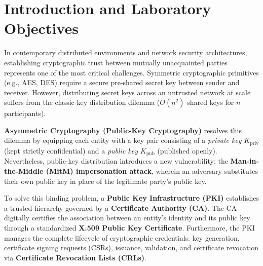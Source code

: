 \documentclass[12pt,a4paper]{article}
\begin{document}
\section{Introduction and Laboratory Objectives}

In contemporary distributed environments and network security architectures, establishing cryptographic trust between mutually unacquainted parties represents one of the most critical challenges. Symmetric cryptographic primitives (e.g., AES, DES) require a secure pre-shared secret key between sender and receiver. However, distributing secret keys across an untrusted network at scale suffers from the classic key distribution dilemma ($O(n^2)$ shared keys for $n$ participants).

\textbf{Asymmetric Cryptography (Public-Key Cryptography)} resolves this dilemma by equipping each entity with a key pair consisting of a \textit{private key} $K_{\text{priv}}$ (kept strictly confidential) and a \textit{public key} $K_{\text{pub}}$ (published openly). Nevertheless, public-key distribution introduces a new vulnerability: the \textbf{Man-in-the-Middle (MitM) impersonation attack}, wherein an adversary substitutes their own public key in place of the legitimate party's public key. 

To solve this binding problem, a \textbf{Public Key Infrastructure (PKI)} establishes a trusted hierarchy governed by a \textbf{Certificate Authority (CA)}. The CA digitally certifies the association between an entity's identity and its public key through a standardized \textbf{X.509 Public Key Certificate}. Furthermore, the PKI manages the complete lifecycle of cryptographic credentials: key generation, certificate signing requests (CSRs), issuance, validation, and certificate revocation via \textbf{Certificate Revocation Lists (CRLs)}.
\end{document}
